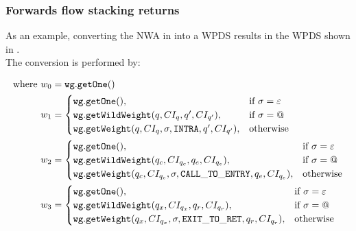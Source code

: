 \subsubsection{Forwards flow stacking returns}

As an example, converting the NWA in  into a WPDS results
in the WPDS shown in . \\


The conversion is performed by:


\begin{align*}
\text{where }
w_0 &= \mathtt{wg.getOne}() \\
w_1 &= \begin{cases}
           \mathtt{wg.getOne}(), & \text{if } \sigma = \varepsilon \\
           \mathtt{wg.getWildWeight}(q,CI_q,q',CI_{q'}), & \text{if } \sigma = \text{\ensuremath{@}} \\
           \mathtt{wg.getWeight}(q,CI_q,\sigma, \mathtt{INTRA},q',CI_{q'}), & \text{otherwise}
       \end{cases} \\
w_2 &= \begin{cases}
           \mathtt{wg.getOne}(), & \text{if } \sigma = \varepsilon \\
           \mathtt{wg.getWildWeight}(q_c,CI_{q_c},q_e,CI_{q_e}), & \text{if } \sigma = \text{\ensuremath{@}} \\
           \mathtt{wg.getWeight}(q_c,CI_{q_c},\sigma, \mathtt{CALL\_TO\_ENTRY},q_e,CI_{q_e}), & \text{otherwise}
      \end{cases} \\
w_3 &= \begin{cases}
          \mathtt{wg.getOne}(), & \text{if } \sigma = \varepsilon \\
          \mathtt{wg.getWildWeight}(q_x,CI_{q_x},q_r,CI_{q_r}), & \text{if } \sigma = \text{\ensuremath{@}} \\
          \mathtt{wg.getWeight}(q_x,CI_{q_x},\sigma, \mathtt{EXIT\_TO\_RET},q_r,CI_{q_r}), & \text{otherwise}
      \end{cases} 
\end{align*}
